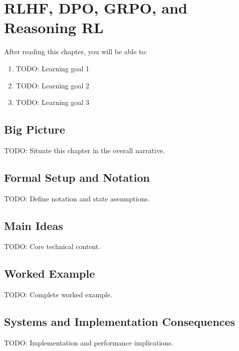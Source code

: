 \chapter{RLHF, DPO, GRPO, and Reasoning RL}
\label{ch:25}

\begin{keyinsight}
After reading this chapter, you will be able to:
\begin{enumerate}
  \item TODO: Learning goal 1
  \item TODO: Learning goal 2
  \item TODO: Learning goal 3
\end{enumerate}
\end{keyinsight}

\section{Big Picture}
\label{ch:25:sec:big_picture}

TODO: Situate this chapter in the overall narrative.

\section{Formal Setup and Notation}
\label{ch:25:sec:setup}

TODO: Define notation and state assumptions.

\section{Main Ideas}
\label{ch:25:sec:main}

TODO: Core technical content.

\section{Worked Example}
\label{ch:25:sec:example}

TODO: Complete worked example.

\section{Systems and Implementation Consequences}
\label{ch:25:sec:systems}

TODO: Implementation and performance implications.

